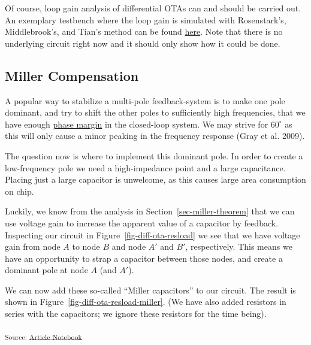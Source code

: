 \documentclass[
  a4paper,
  DIV=11,
  numbers=noendperiod]{scrartcl}
\begin{document}
Of course, loop gain analysis of differential OTAs can and should be
carried out. An exemplary testbench where the loop gain is simulated
with Rosenstark's, Middlebrook's, and Tian's method can be found
\href{xschem/ota-differential_tb-loopgain.sch}{here}. Note that there is
no underlying circuit right now and it should only show how it could be
done.

\subsection{Miller Compensation}\label{miller-compensation}

A popular way to stabilize a multi-pole feedback-system is to make one
pole dominant, and try to shift the other poles to sufficiently high
frequencies, that we have enough
\href{https://en.wikipedia.org/wiki/Phase_margin}{phase margin} in the
closed-loop system. We may strive for \(60^\circ\) as this will only
cause a minor peaking in the frequency response (Gray et al. 2009).

The question now is where to implement this dominant pole. In order to
create a low-frequency pole we need a high-impedance point and a large
capacitance. Placing just a large capacitor is unwelcome, as this causes
large area consumption on chip.

Luckily, we know from the analysis in Section~\ref{sec-miller-theorem}
that we can use voltage gain to increase the apparent value of a
capacitor by feedback. Inspecting our circuit in
Figure~\ref{fig-diff-ota-resload} we see that we have voltage gain from
node \(A\) to node \(B\) and node \(A'\) and \(B'\), respectively. This
means we have an opportunity to strap a capacitor between those nodes,
and create a dominant pole at node \(A\) (and \(A'\)).

We can now add these so-called ``Miller capacitors'' to our circuit. The
result is shown in Figure~\ref{fig-diff-ota-resload-miller}. (We have
also added resistors in series with the capacitors; we ignore these
resistors for the time being).

\textsubscript{Source:
\href{https://iic-jku.github.io/analog-circuit-design/index.qmd.html}{Article
Notebook}}
\end{document}
